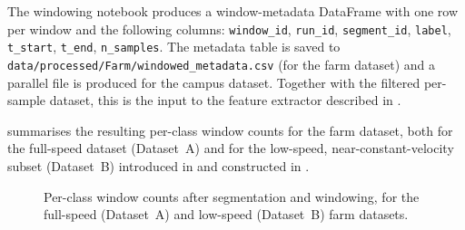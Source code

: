 The windowing notebook produces a window-metadata DataFrame with one row per window and the following columns: \texttt{window\_id}, \texttt{run\_id}, \texttt{segment\_id}, \texttt{label}, \texttt{t\_start}, \texttt{t\_end}, \texttt{n\_samples}. The metadata table is saved to \texttt{data/processed/Farm/windowed\_metadata.csv} (for the farm dataset) and a parallel file is produced for the campus dataset. Together with the filtered per-sample dataset, this is the input to the feature extractor described in .

 summarises the resulting per-class window counts for the farm dataset, both for the full-speed dataset (Dataset~A) and for the low-speed, near-constant-velocity subset (Dataset~B) introduced in  and constructed in
.

\begin{figure}[H]
    \centering
    \caption{Per-class window counts after segmentation and windowing,
    for the full-speed (Dataset~A) and low-speed (Dataset~B) farm
    datasets.}
    \label{fig:window_counts}
\end{figure}


